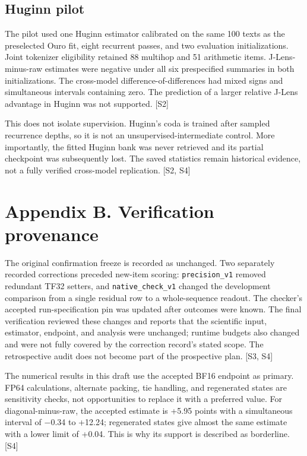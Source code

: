 \documentclass[
  11pt,
  a4paper,
]{article}
\begin{document}
\subsection{Huginn pilot}\label{huginn-pilot}

The pilot used one Huginn estimator calibrated on the same 100 texts as
the preselected Ouro fit, eight recurrent passes, and two evaluation
initializations. Joint tokenizer eligibility retained 88 multihop and 51
arithmetic items. J-Lens-minus-raw estimates were negative under all six
prespecified summaries in both initializations. The cross-model
difference-of-differences had mixed signs and simultaneous intervals
containing zero. The prediction of a larger relative J-Lens advantage in
Huginn was not supported. {[}S2{]}

This does not isolate supervision. Huginn's coda is trained after
sampled recurrence depths, so it is not an unsupervised-intermediate
control. More importantly, the fitted Huginn bank was never retrieved
and its partial checkpoint was subsequently lost. The saved statistics
remain historical evidence, not a fully verified cross-model
replication. {[}S2, S4{]}

\newpage

\section{Appendix B. Verification
provenance}\label{appendix-b.-verification-provenance}

The original confirmation freeze is recorded as unchanged. Two
separately recorded corrections preceded new-item scoring:
\texttt{precision\_v1} removed redundant TF32 setters, and
\texttt{native\_check\_v1} changed the development comparison from a
single residual row to a whole-sequence readout. The checker's accepted
run-specification pin was updated after outcomes were known. The final
verification reviewed these changes and reports that the scientific
input, estimator, endpoint, and analysis were unchanged; runtime budgets
also changed and were not fully covered by the correction record's
stated scope. The retrospective audit does not become part of the
prospective plan. {[}S3, S4{]}

The numerical results in this draft use the accepted BF16 endpoint as
primary. FP64 calculations, alternate packing, tie handling, and
regenerated states are sensitivity checks, not opportunities to replace
it with a preferred value. For diagonal-minus-raw, the accepted estimate
is +5.95 points with a simultaneous interval of −0.34 to +12.24;
regenerated states give almost the same estimate with a lower limit of
+0.04. This is why its support is described as borderline. {[}S4{]}
\end{document}
